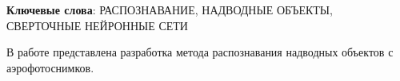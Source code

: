 \begin{essay}{}
    \noindent\textbf{Ключевые слова}: РАСПОЗНАВАНИЕ, НАДВОДНЫЕ ОБЪЕКТЫ, СВЕРТОЧНЫЕ НЕЙРОННЫЕ СЕТИ
    
    В работе представлена разработка метода распознавания надводных объектов с аэрофотоснимков.
    
    

\end{essay}